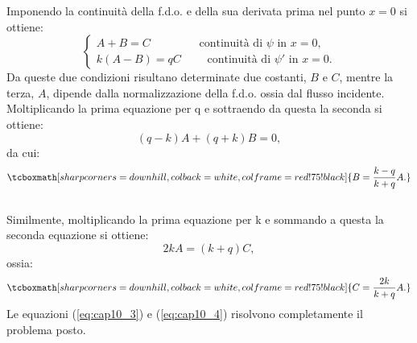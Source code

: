 \documentclass[a4paper,12pt,oneside]{book}
\begin{document}
Imponendo la continuità della f.d.o. e della sua derivata prima nel punto $x=0$ si ottiene:
	\begin{equation}
		\begin{cases}
		A+B=C \quad \qquad \quad \textrm{ continuità di }\psi\textrm{ in }x=0,\\
		k\left(A-B \right) =qC\qquad \textrm{ continuità di }\psi '\textrm{ in }x=0.
		\end{cases}
	\end{equation}
Da queste due condizioni risultano determinate due costanti, $B$ e $C$, mentre la terza, $A$, dipende dalla normalizzazione della f.d.o. ossia dal flusso incidente.\\

Moltiplicando la prima equazione per q e sottraendo da questa la seconda si ottiene:
	\begin{equation}
		\left( q-k \right) A + \left( q+k \right)B=0,
	\end{equation}
da cui:
	\begin{equation}
		\tcboxmath[sharp corners=downhill, colback=white, colframe=red!75!black]{
			B= \frac{k-q}{k+q}A.
			}
	\label{eq:cap10_3}
	\end{equation}\\
	
Similmente, moltiplicando la prima equazione per k e sommando a questa la seconda equazione si ottiene:
	\begin{equation}
		2kA=\left( k+q \right)C,
	\end{equation}
ossia:
	\begin{equation}
		\tcboxmath[sharp corners=downhill, colback=white, colframe=red!75!black]{
			C=\frac{2k}{k+q}A.
			}
	\label{eq:cap10_4}
	\end{equation}
Le equazioni (\ref{eq:cap10_3}) e (\ref{eq:cap10_4}) risolvono completamente il problema posto.\\
\end{document}
